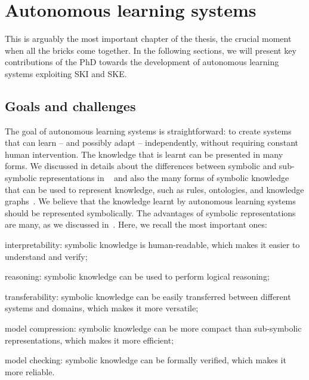 
\chapter{Autonomous learning systems}
\label{ch:autonomous-learning-systems}
\minitoc


This is arguably the most important chapter of the thesis, the crucial moment when all the bricks come together.
%
In the following sections, we will present key contributions of the PhD towards the development of autonomous learning systems exploiting \gls{SKI} and \gls{SKE}.
%



\section{Goals and challenges}\label{sec:goals-and-challenges}
%
The goal of autonomous learning systems is straightforward: to create systems that can learn -- and possibly adapt -- independently, without requiring constant human intervention.
%
The knowledge that is learnt can be presented in many forms.
%
We discussed in details about the differences between symbolic and sub-symbolic representations in ~ and also the many forms of symbolic knowledge that can be used to represent knowledge, such as rules, ontologies, and knowledge graphs~.
%
We believe that the knowledge learnt by autonomous learning systems should be represented symbolically.
%
The advantages of symbolic representations are many, as we discussed in~.
%
Here, we recall the most important ones:
%
\begin{inlinelist}
    \item interpretability: symbolic knowledge is human-readable, which makes it easier to understand and verify;
    \item reasoning: symbolic knowledge can be used to perform logical reasoning;
    \item transferability: symbolic knowledge can be easily transferred between different systems and domains, which makes it more versatile;
    \item model compression: symbolic knowledge can be more compact than sub-symbolic representations, which makes it more efficient;
    \item model checking: symbolic knowledge can be formally verified, which makes it more reliable.
\end{inlinelist}


